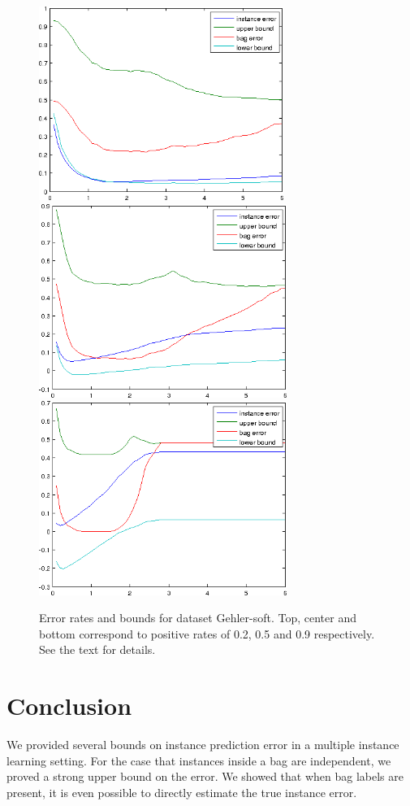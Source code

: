 \begin{figure}[tbp]
	\begin{center}
		\includegraphics[height=63mm]{images/non_iid_02.png}
		\includegraphics[height=63mm]{images/non_iid_05.png}
		\includegraphics[height=63mm]{images/non_iid_09.png}
	\end{center}
	\caption{Error rates and bounds for dataset Gehler-soft. Top, center and bottom correspond to positive rates of 0.2, 0.5 and 0.9 respectively.
    See the text for details.}
\end{figure}

\section{Conclusion}
We provided several bounds on instance prediction error in a multiple instance learning setting.
For the case that instances inside a bag are independent, we proved a strong upper bound on the error.
We showed that when bag labels are present, it is even possible to directly estimate the true instance error.

